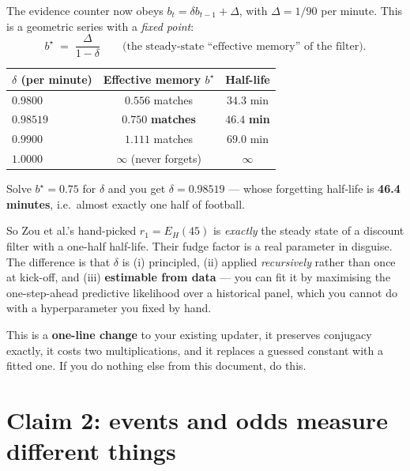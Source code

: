 \documentclass[11pt,a4paper]{article}
\theoremstyle{plain}
\begin{document}
\begin{worked}
The evidence counter now obeys $b_t = \delta b_{t-1} + \Delta$, with $\Delta = 1/90$ per minute.
This is a geometric series with a \emph{fixed point}:
\[
  b^\star \;=\; \frac{\Delta}{1-\delta}
  \qquad\text{(the steady-state ``effective memory'' of the filter).}
\]

\smallskip
\begin{center}
\begin{tabular}{@{}lcc@{}}
\toprule
$\delta$ (per minute) & Effective memory $b^\star$ & Half-life \\
\midrule
$0.9800$ & $0.556$ matches & $34.3$ min \\
$\mathbf{0.98519}$ & $\mathbf{0.750}$ \textbf{matches} & $\mathbf{46.4}$ \textbf{min} \\
$0.9900$ & $1.111$ matches & $69.0$ min \\
$1.0000$ & $\infty$ (never forgets) & $\infty$ \\
\bottomrule
\end{tabular}
\end{center}

\smallskip
Solve $b^\star = 0.75$ for $\delta$ and you get $\delta = 0.98519$ --- whose forgetting
half-life is \textbf{46.4 minutes}, i.e.\ almost exactly one half of football.

\smallskip
So Zou et al.'s hand-picked $r_1 = E_H(45)$ is \emph{exactly} the steady state of a discount
filter with a one-half half-life. Their fudge factor is a real parameter in disguise. The
difference is that $\delta$ is (i) principled, (ii) applied \emph{recursively} rather than
once at kick-off, and (iii) \textbf{estimable from data} --- you can fit it by maximising the
one-step-ahead predictive likelihood over a historical panel, which you cannot do with a
hyperparameter you fixed by hand.
\end{worked}

\begin{point}
This is a \textbf{one-line change} to your existing updater, it preserves conjugacy exactly,
it costs two multiplications, and it replaces a guessed constant with a fitted one. If you do
nothing else from this document, do this.
\end{point}

\section{Claim 2: events and odds measure different things}
\end{document}
